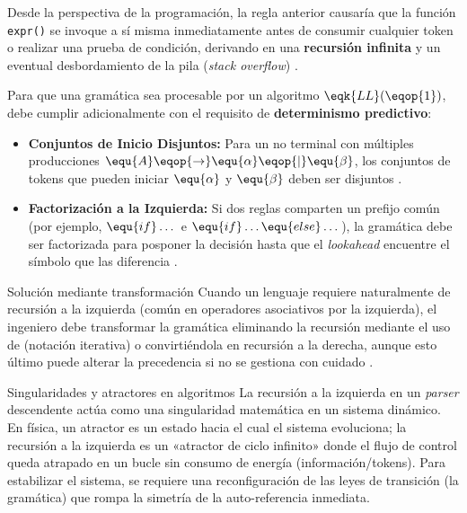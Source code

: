 Desde la perspectiva de la programación, la regla anterior causaría que la función \texttt{expr()} se invoque a sí misma inmediatamente antes de consumir cualquier token o realizar una prueba de condición, derivando en una \textbf{recursión infinita} y un eventual desbordamiento de la pila (\textit{stack overflow}) \cite{aho2006compilers}.

Para que una gramática sea procesable por un algoritmo $\eqk{LL}(\eqop{1})$, debe cumplir adicionalmente con el requisito de \textbf{determinismo predictivo}:
\begin{itemize}
    \item \textbf{Conjuntos de Inicio Disjuntos:} Para un no terminal con múltiples producciones $\equ{A} \eqop{\rightarrow} \equ{\alpha} \eqop{\mid} \equ{\beta}$, los conjuntos de tokens que pueden iniciar $\equ{\alpha}$ y $\equ{\beta}$ deben ser disjuntos \cite{aho2006compilers,sipser2012introduction}. 
    \item \textbf{Factorización a la Izquierda:} Si dos reglas comparten un prefijo común (por ejemplo, $\equ{if} \dots$ e $\equ{if} \dots \equ{else} \dots$), la gramática debe ser factorizada para posponer la decisión hasta que el \textit{lookahead} encuentre el símbolo que las diferencia \cite{aho2006compilers}.
\end{itemize}

\begin{observacion}{Solución mediante transformación}
Cuando un lenguaje requiere naturalmente de recursión a la izquierda (común en operadores asociativos por la izquierda), el ingeniero debe transformar la gramática eliminando la recursión mediante el uso de  (notación iterativa) o convirtiéndola en recursión a la derecha, aunque esto último puede alterar la precedencia si no se gestiona con cuidado \cite{aho2006compilers}.
\end{observacion}

\begin{fisicaconexion}{Singularidades y atractores en algoritmos}
La recursión a la izquierda en un \textit{parser} descendente actúa como una singularidad matemática en un sistema dinámico. En física, un atractor es un estado hacia el cual el sistema evoluciona; la recursión a la izquierda es un «atractor de ciclo infinito» donde el flujo de control queda atrapado en un bucle sin consumo de energía (información/tokens). Para estabilizar el sistema, se requiere una reconfiguración de las leyes de transición (la gramática) que rompa la simetría de la auto-referencia inmediata.
\end{fisicaconexion}


